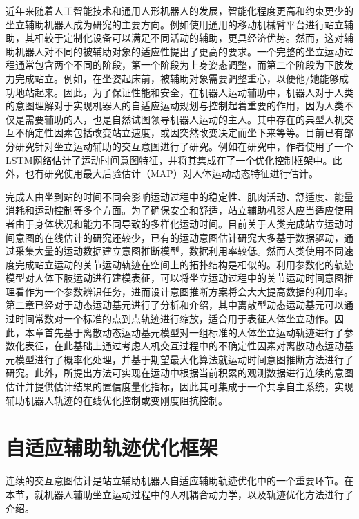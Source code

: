 近年来随着人工智能技术和通用人形机器人的发展，智能化程度更高和约束更少的坐立辅助机器人成为研究的主要方向。例如使用通用的移动机械臂平台进行站立辅助，其相较于定制化设备可以满足不同活动的辅助，更具经济优势\cite{liIntegratedApproachRobotic2021}。然而，这对辅助机器人对不同的被辅助对象的适应性提出了更高的要求。一个完整的坐立运动过程通常包含两个不同的阶段，第一个阶段为上身姿态调整，而第二个阶段为下肢发力完成站立。例如，在坐姿起床前，被辅助对象需要调整重心，以便他/她能够成功地站起来。因此，为了保证性能和安全，在机器人运动辅助中，机器人对于人类的意图理解对于实现机器人的自适应运动规划与控制起着重要的作用，因为人类不仅是需要辅助的人，也是自然试图领导机器人运动的主人。其中存在的典型人机交互不确定性因素包括改变站立速度，或因突然改变决定而坐下来等等。目前已有部分研究针对坐立运动辅助的交互意图进行了研究。例如在研究\cite{liIntegratedApproachRobotic2021}中，作者使用了一个LSTM网络估计了运动时间意图特征，并将其集成在了一个优化控制框架中。此外，也有研究使用最大后验估计（MAP）对人体运动动态特征进行估计\cite{romanoCoDyCoProjectAchievements2018}。

完成人由坐到站的时间不同会影响运动过程中的稳定性、肌肉活动、舒适度、能量消耗和运动控制等多个方面。为了确保安全和舒适，站立辅助机器人应当适应使用者由于身体状况和能力不同导致的多样化运动时间。目前关于人类完成站立运动时间意图的在线估计的研究还较少，已有的运动意图估计研究大多基于数据驱动，通过采集大量的运动数据建立意图推断模型，数据利用率较低。然而人类使用不同速度完成站立运动的关节运动轨迹在空间上的拓扑结构是相似的。利用参数化的轨迹模型对人体下肢运动进行建模表征，可以将坐立运动过程中的关节运动时间意图推理看作为一个参数辨识任务，进而设计意图推断方案将会大大提高数据的利用率。第二章已经对于动态运动基元进行了分析和介绍，其中离散型动态运动基元可以通过时间常数对一个标准的点到点轨迹进行缩放，适合用于表征人体坐立动作。因此，本章首先基于离散动态运动基元模型对一组标准的人体坐立运动轨迹进行了参数化表征，在此基础上通过考虑人机交互过程中的不确定性因素对离散动态运动基元模型进行了概率化处理，并基于期望最大化算法就运动时间意图推断方法进行了研究。此外，所提出方法可实现在运动中根据当前积累的观测数据进行连续的意图估计并提供估计结果的置信度量化指标，因此其可集成于一个共享自主系统，实现辅助机器人轨迹的在线优化控制或变刚度阻抗控制。
\section{自适应辅助轨迹优化框架}  
连续的交互意图估计是站立辅助机器人自适应辅助轨迹优化中的一个重要环节。在本节，就机器人辅助坐立运动过程中的人机耦合动力学，以及轨迹优化方法进行了介绍。
